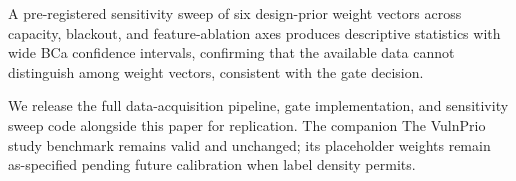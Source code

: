 \documentclass[conference]{IEEEtran}
\begin{document}
A pre-registered sensitivity sweep of six design-prior weight vectors
across capacity, blackout, and feature-ablation axes produces descriptive
statistics with wide BCa confidence intervals, confirming that the
available data cannot distinguish among weight vectors, consistent with the
gate decision.

We release the full data-acquisition pipeline, gate implementation, and
sensitivity sweep code alongside this paper for replication. The companion
The VulnPrio study benchmark remains valid and unchanged; its placeholder weights
remain as-specified pending future calibration when label density permits.

\balance



\end{document}
